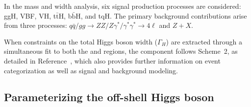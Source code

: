 In the \onshell \Hboson mass and width analysis, six signal production processes are considered: ggH, VBF, VH, t$\bar{\text{t}}$H, b$\bar{\text{b}}$H, and tqH. The primary background contributions arise from three processes: $q\bar{q}/gg \to ZZ/Z\gamma^*/\gamma^*\gamma^* \to 4\ell$ and $Z+X$. 

When constraints on the total Higgs boson width ($\Gamma_H$) are extracted through a simultaneous fit to both the \onshell and \offshell regions, the \onshell component follows Scheme~2, as detailed in Reference~\cite{CMS:2021nnc}, which also provides further information on event categorization as well as signal and background modeling.



\subsection{Parameterizing the off-shell Higgs boson} \label{physicsmodel}

